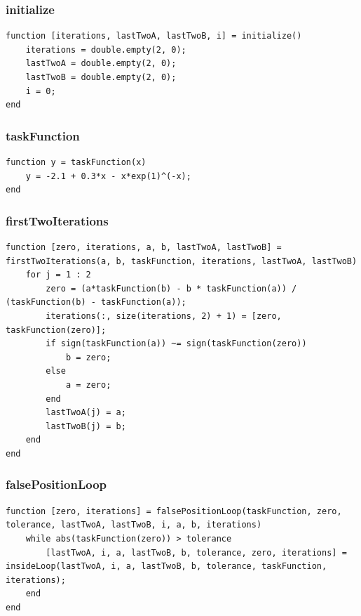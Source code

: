 \subsubsection{initialize}
\begin{simplechar}
\begin{lstlisting}
function [iterations, lastTwoA, lastTwoB, i] = initialize()
    iterations = double.empty(2, 0);
    lastTwoA = double.empty(2, 0);
    lastTwoB = double.empty(2, 0);
    i = 0;
end
\end{lstlisting}
\end{simplechar}

\subsubsection{taskFunction}
\begin{simplechar}
\begin{lstlisting}
function y = taskFunction(x)
    y = -2.1 + 0.3*x - x*exp(1)^(-x);
end
\end{lstlisting}
\end{simplechar}

\newpage
\subsubsection{firstTwoIterations}
\begin{simplechar}
\begin{lstlisting}
function [zero, iterations, a, b, lastTwoA, lastTwoB] = firstTwoIterations(a, b, taskFunction, iterations, lastTwoA, lastTwoB)
    for j = 1 : 2
        zero = (a*taskFunction(b) - b * taskFunction(a)) / (taskFunction(b) - taskFunction(a));
        iterations(:, size(iterations, 2) + 1) = [zero, taskFunction(zero)];
        if sign(taskFunction(a)) ~= sign(taskFunction(zero))
            b = zero;
        else
            a = zero;
        end
        lastTwoA(j) = a;
        lastTwoB(j) = b;
    end
end
\end{lstlisting}
\end{simplechar}

\subsubsection{falsePositionLoop}
\begin{simplechar}
\begin{lstlisting}
function [zero, iterations] = falsePositionLoop(taskFunction, zero, tolerance, lastTwoA, lastTwoB, i, a, b, iterations)
    while abs(taskFunction(zero)) > tolerance
        [lastTwoA, i, a, lastTwoB, b, tolerance, zero, iterations] = insideLoop(lastTwoA, i, a, lastTwoB, b, tolerance, taskFunction, iterations);
    end
end
\end{lstlisting}
\end{simplechar}

